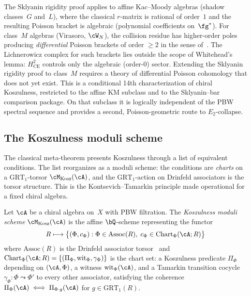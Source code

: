 \begin{remark}
\label{rem:sklyanin-koszulness-scope}
The Sklyanin rigidity proof applies to affine Kac--Moody algebras
(shadow classes~$G$ and~$L$), where the classical $r$-matrix is
rational of order~$1$ and the resulting Poisson bracket is
algebraic (polynomial coefficients on~$\fg^*$). For class~$M$
algebras (Virasoro, $\cW_N$), the collision residue has higher-order
poles producing \emph{differential} Poisson brackets of order
$\geq 2$ in the sense of~\cite{LPV13}. The Lichnerowicz complex
for such brackets lies outside the scope of Whitehead's lemma:
$H^2_{\mathrm{CE}}$ controls only the algebraic (order-$0$) sector.
Extending the Sklyanin rigidity proof to class~$M$ requires a theory
of differential Poisson cohomology that does not yet exist.
This is a conditional 14th characterization of chiral Koszulness,
restricted to the affine KM subclass and to the Sklyanin--bar comparison
package. On that subclass it is logically independent of the PBW
spectral sequence and provides a second, Poisson-geometric route to
$E_2$-collapse.
\end{remark}


\subsection{The Koszulness moduli scheme}
\label{subsec:koszulness-moduli}

The classical meta-theorem presents Koszulness through a list of
equivalent conditions. The list reorganizes as a moduli
scheme: the conditions are \emph{charts} on a
$\mathrm{GRT}_1$-torsor $\cM_{\mathrm{Kosz}}(\cA)$, and the
$\mathrm{GRT}_1$-action on Drinfeld associators is the torsor
structure. This is the Kontsevich--Tamarkin principle made
operational for a fixed chiral algebra.

\begin{definition}
\label{def:koszulness-moduli-scheme-kp}
Let $\cA$ be a chiral algebra on~$X$ with PBW filtration. The
\emph{Koszulness moduli scheme} $\cM_{\mathrm{Kosz}}(\cA)$ is the
affine $\bQ$-scheme representing the functor
\[
R \longmapsto
\bigl\{(\Phi, c_\Phi) :
\Phi \in \mathrm{Assoc}(R),\;
c_\Phi \in \mathrm{Chart}_\Phi(\cA;R)\bigr\}
\]
where $\mathrm{Assoc}(R)$ is the Drinfeld associator
torsor~\cite{Drinfeld90} and
$\mathrm{Chart}_\Phi(\cA;R) = \{(\Pi_\Phi, \mathrm{wit}_\Phi,
\gamma_\Phi)\}$ is the chart set: a Koszulness predicate
$\Pi_\Phi$ depending on $(\cA, \Phi)$, a witness
$\mathrm{wit}_\Phi(\cA)$, and a Tamarkin transition cocycle
$\gamma_\Phi\colon \Phi \leadsto \Phi'$ to every other
associator, satisfying the coherence
$\Pi_\Phi(\cA) \iff \Pi_{\Phi \cdot g}(\cA)$
for $g \in \mathrm{GRT}_1(R)$.
\end{definition}

